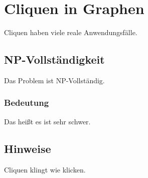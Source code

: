 \documentclass{scrartcl}
\begin{document}
	\section{Cliquen in Graphen}
	Cliquen haben viele reale Anwendungsfälle.
	\subsection{NP-Vollständigkeit}
	Das Problem ist NP-Vollständig.
	\subsubsection{Bedeutung}
	Das heißt es ist sehr schwer.
	\subsection*{Hinweise}
	Cliquen klingt wie klicken.
\end{document}
